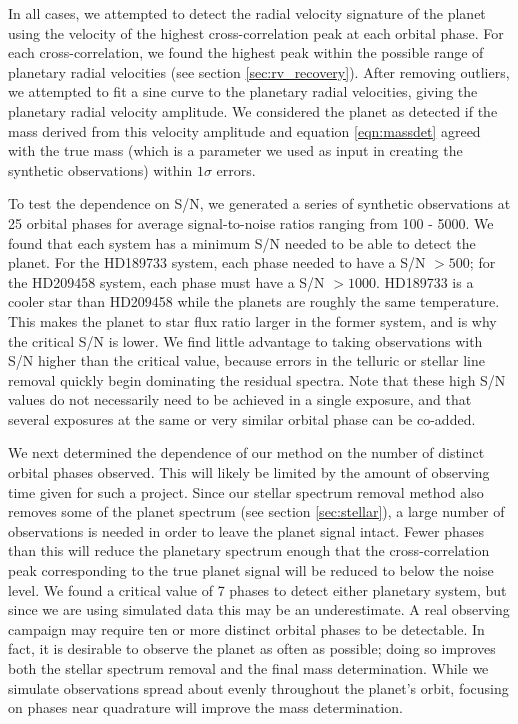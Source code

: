 \documentclass[11pt]{report}     %
\begin{document}
In all cases, we attempted to detect the radial velocity signature of
the planet using the velocity of the highest cross-correlation peak at
each orbital phase. For each cross-correlation, we found the highest
peak within the possible range of planetary radial velocities (see
section \ref{sec:rv_recovery}). After removing outliers, we attempted to fit a sine curve
to the planetary radial velocities, giving the planetary radial velocity amplitude. We considered
the planet as detected if the mass derived from this velocity
amplitude and equation \ref{eqn:massdet} agreed with the true mass
(which is a parameter we used as input in creating the synthetic
observations) within $1\sigma$ errors. 

To test the dependence on S/N, we generated a series of synthetic observations at 25 orbital phases
for average signal-to-noise ratios ranging from 100  - 5000. We found
that each system has a minimum S/N needed to be able to detect the
planet. For the HD189733 system, each phase needed to have a S/N $>
500$; for the HD209458 system, each phase must have a S/N $>
1000$. HD189733 is a cooler star than HD209458 while the planets are
roughly the same temperature. This makes the planet to star flux ratio
larger in the former system, and is why the critical S/N is
lower. We find little advantage to taking observations with S/N higher
than the critical value, because errors in the telluric or stellar
line removal quickly begin dominating the residual spectra. Note that these high S/N values
do not necessarily need to be achieved in a single exposure, and that several exposures
at the same or very similar orbital phase can be co-added. 

We next determined the dependence of our method on the number of
distinct orbital phases observed. This will likely be limited by the amount of
observing time given for such a project. Since our stellar spectrum removal method also
removes some of the planet spectrum (see section \ref{sec:stellar}), a
large number of observations is needed in order to leave the planet
signal intact. Fewer phases than this will reduce the planetary spectrum 
enough that the cross-correlation peak corresponding
to the true planet signal will be reduced to below the noise level. 
We found a critical value of 7 phases to detect either planetary system, but since we are using simulated
data this may be an underestimate. A real observing campaign may require ten or more distinct 
orbital phases to be detectable. In fact, it is desirable to observe the planet as often as possible;
doing so improves both the stellar spectrum removal and the final mass determination. While we simulate observations spread about evenly throughout the planet's orbit, focusing on phases near quadrature will improve the mass determination.
\end{document}
